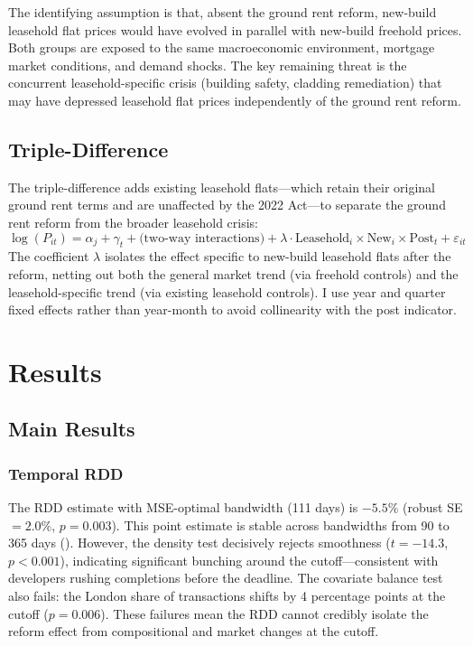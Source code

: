 \documentclass[12pt]{article}
\begin{document}
The identifying assumption is that, absent the ground rent reform, new-build leasehold flat prices would have evolved in parallel with new-build freehold prices. Both groups are exposed to the same macroeconomic environment, mortgage market conditions, and demand shocks. The key remaining threat is the concurrent leasehold-specific crisis (building safety, cladding remediation) that may have depressed leasehold flat prices independently of the ground rent reform.

\subsection{Triple-Difference}

The triple-difference adds existing leasehold flats---which retain their original ground rent terms and are unaffected by the 2022 Act---to separate the ground rent reform from the broader leasehold crisis:
\begin{equation}
\log(P_{it}) = \alpha_j + \gamma_t + \text{(two-way interactions)} + \lambda \cdot \text{Leasehold}_i \times \text{New}_i \times \text{Post}_t + \varepsilon_{it}
\label{eq:ddd}
\end{equation}
The coefficient $\lambda$ isolates the effect specific to new-build leasehold flats after the reform, netting out both the general market trend (via freehold controls) and the leasehold-specific trend (via existing leasehold controls). I use year and quarter fixed effects rather than year-month to avoid collinearity with the post indicator.

\section{Results}

\subsection{Main Results}

\subsubsection*{Temporal RDD} The RDD estimate with MSE-optimal bandwidth (111 days) is $-5.5\%$ (robust SE $= 2.0\%$, $p = 0.003$). This point estimate is stable across bandwidths from 90 to 365 days (). However, the density test decisively rejects smoothness ($t = -14.3$, $p < 0.001$), indicating significant bunching around the cutoff---consistent with developers rushing completions before the deadline. The covariate balance test also fails: the London share of transactions shifts by 4 percentage points at the cutoff ($p = 0.006$). These failures mean the RDD cannot credibly isolate the reform effect from compositional and market changes at the cutoff.
\end{document}

